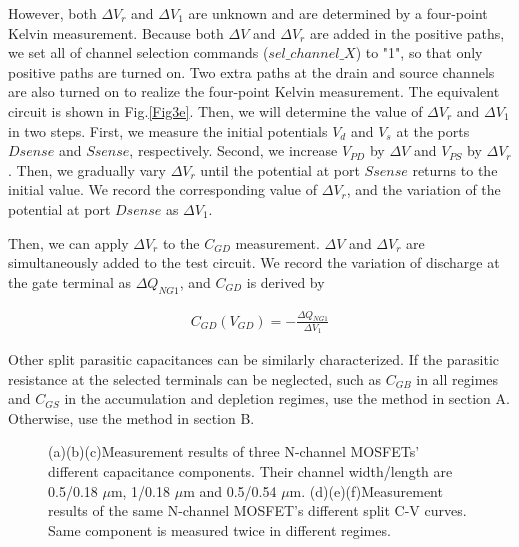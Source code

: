 \documentclass[journal]{IEEEtran}
\begin{document}
However, both $\Delta V_{r}$ and $\Delta V_{1}$ are unknown and are determined by a four-point Kelvin measurement. Because both $\Delta V$ and $\Delta V_{r}$ are added in the positive paths, we set all of channel selection commands ($sel\_channel\_X$) to "1", so that only positive paths are turned on. Two extra paths at the drain and source channels are also turned on to realize the four-point Kelvin measurement. The equivalent circuit is shown in Fig.\ref{Fig3e}. Then, we will determine the value of $\Delta V_{r}$ and $\Delta V_{1}$ in two steps. First, we measure the initial potentials $V_{d}$ and $V_{s}$ at the ports $Dsense$ and $Ssense$, respectively. Second, we increase $V_{PD}$ by $\Delta V$ and $V_{PS}$ by $\Delta V_{r}$. Then, we gradually vary $\Delta V_{r}$ until the potential at port $Ssense$ returns to the initial value. We record the corresponding value of $\Delta V_{r}$, and the variation of the potential at port $Dsense$ as $\Delta V_{1}$. 

Then, we can apply $\Delta V_{r}$ to the $C_{GD}$ measurement. $\Delta V$ and $\Delta V_{r}$ are simultaneously added to the test circuit. We record the variation of discharge at the gate terminal as $\Delta Q_{NG1}$, and $C_{GD}$ is derived by  

\begin{align}
  C_{GD}(V_{GD})=-\frac{\Delta Q_{NG1}}{\Delta V_{1}}
\end{align}


Other split parasitic capacitances can be similarly characterized. If the parasitic resistance at the selected terminals can be neglected, such as $C_{GB}$ in all regimes and $C_{GS}$ in the accumulation and depletion regimes, use the method in section A. Otherwise, use the method in section B.





\begin{figure*}
\centering
{}

\caption{(a)(b)(c)Measurement results of three N-channel MOSFETs' different capacitance components. Their channel width/length are 0.5/0.18 $\mu$m, 1/0.18 $\mu$m and 0.5/0.54 $\mu$m. (d)(e)(f)Measurement results of the same N-channel MOSFET's different split C-V curves. Same component is measured twice in different regimes.}
\label{Fig5}
\end{figure*}
\end{document}
